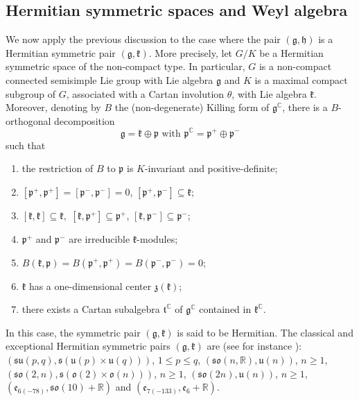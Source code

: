 \documentclass{amsart}[draft,11pt]
\newcommand{\mg}{\mathfrak{g}}
\newcommand{\mh}{\mathfrak{h}}
\newcommand{\mk}{\mathfrak{k}}
\newcommand{\fg}{{\mathfrak{g}}}
\newcommand{\fk}{{\mathfrak{k}}}
\newcommand{\fo}{{\mathfrak{o}}}
\newcommand{\fSp}{{\mathfrak{so}}}
\newcommand{\fp}{{\mathfrak{p}}}
\newcommand{\fs}{{\mathfrak{s}}}
\newcommand{\CC}{{\mathbb{C}}}
\newcommand{\bR}{{\mathbb{R}}}
\newcommand{\fe}{{\mathfrak{e}}}
\numberwithin{equation}{section}
\theoremstyle{definition}
\begin{document}
\subsection{Hermitian symmetric spaces and Weyl algebra}
We now apply the previous discussion to the case where 
the pair $(\mg,\mh)$ is a Hermitian symmetric pair $(\mg,\mk)$.
More precisely, let $G/K$ be a Hermitian symmetric space of the non-compact type. In particular, $G$ is a non-compact connected semisimple Lie group with Lie algebra $\fg$ and $K$ is a maximal compact subgroup of $G$, associated with a Cartan involution $\theta$, with Lie algebra $\fk$. Moreover, denoting by $B$ the (non-degenerate) Killing form of $\fg^\mathbb{C}$, there is a $B$-orthogonal decomposition
\begin{equation}
\fg=\fk\oplus\fp\text{ with } 
\fp^\CC=\fp^+\oplus\fp^-
\end{equation}
such that 
\begin{enumerate}
\item the restriction of $B$ to $\fp$ is $K$-invariant and positive-definite;
\item $[\fp^+,\fp^+]=[\fp^-,\fp^-]=0$, $[\fp^+,\fp^-]\subseteq \fk$; 
\item $[\fk,\fk]\subseteq \fk,$ $[\fk,\fp^+]\subseteq \fp^+$,  $[\fk,\fp^-]\subseteq \fp^-$;
\item $\fp^+$ and $\fp^-$ are irreducible $\fk$-modules;
\item $B(\fk,\fp)=B(\fp^+,\fp^+)=B(\fp^-,\fp^-)=0$;
\item $\fk$ has a one-dimensional center $\mathfrak{z}(\fk)$;
\item there exists a Cartan subalgebra ${\mathfrak t}^\CC$ of $\fg^\CC$ contained in $\fk^\CC$.
\end{enumerate}
    In this case, the symmetric pair $(\fg,\fk)$ is said to be Hermitian. The classical and exceptional Hermitian symmetric pairs $(\fg,\fk)$ are (see for instance \cite[Table V, p. 578]{He}): $(\fs{\mathfrak u}(p,q),\fs({\mathfrak u}(p)\times {\mathfrak u}(q)))$, $1\leq p\leq q$, $(\fSp(n,\bR),{\mathfrak u}(n))$, $n\geq 1$, $(\fs\fo(2,n),\fs({\mathfrak o}(2)\times{\mathfrak o}(n)))$, $n\geq 1$, $(\fs\fo(2n),{\mathfrak u}(n))$, $n\geq 1$, $(\fe_{6(-78)},\fs\fo(10)+\bR)$ and $(\fe_{7(-133)},\fe_6+\bR)$. 
\end{document}

